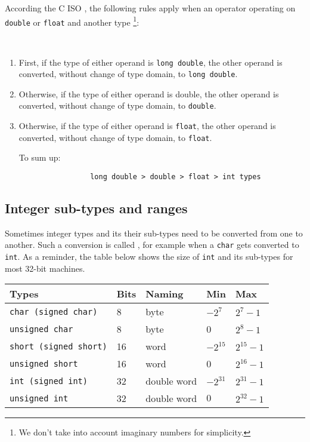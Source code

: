 According the C ISO \cite{ciso2007}, the following rules apply when an operator operating on \texttt{double} or \texttt{float} and another type \footnote{We don't take into account imaginary numbers for simplicity.}:
\begin{takeaway}
\; \\
\begin{enumerate}
    \item First, if the  type of either operand is \texttt{long double}, the other
operand is converted, without change of type domain, to \texttt{long double}.
    \item Otherwise, if the type of either operand is double, the other
operand is converted, without change of type domain, to \texttt{double}.
    \item Otherwise, if the type of either operand is \texttt{float}, the other
operand is converted, without change of type domain, to \texttt{float}. 

To sum up:
\end{enumerate}

\begin{verbatim}
                    long double > double > float > int types
\end{verbatim}
\end{takeaway}


\subsection{Integer sub-types and ranges}

Sometimes integer types and its their sub-types need to be converted from one to another. Such a conversion is called , for example when a \texttt{char} gets converted to \texttt{int}. As a reminder, the table below shows the size of \texttt{int} and its sub-types for most 32-bit machines.

\begin{tabular}{p{}p{}p{}p{}p{}} \toprule %
{Types} & {Bits} & {Naming} & {Min} &{Max} \\ \midrule
    \texttt{char (signed char)} & 8 & byte & $-2^7$ & $2^7-1$\\
    \texttt{unsigned char} &  8 & byte &0 & $2^8-1$\\
    \texttt{short (signed short)} &  16 & word & $-2^{15}$ & $2^{15}-1$\\
    \texttt{unsigned short} &  16 & word & 0 & $2^{16}-1$\\
    \texttt{int (signed int)} &  32 & double word & $-2^{31}$ & $2^{31}-1$\\
    \texttt{unsigned int} &  32 & double word & $0$ & $2^{32}-1$\\
    \bottomrule
\end{tabular}

